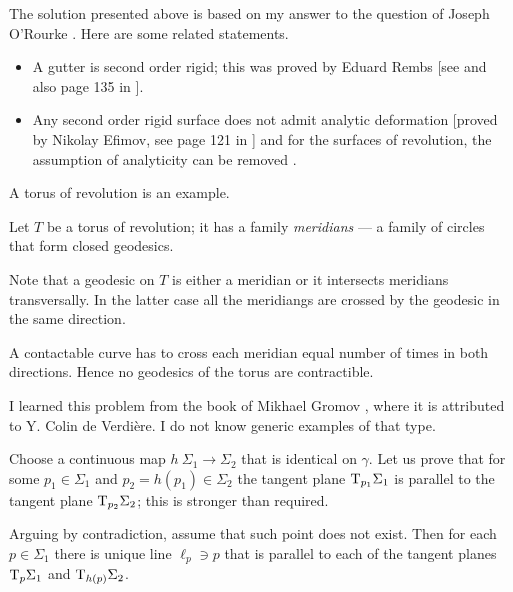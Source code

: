 The solution presented above is based on my answer 
to the question of Joseph O'Rourke \cite[see][]{rourke}.
Here are some related statements.
\begin{itemize}
\item A gutter is second order rigid;
this was proved by Eduard Rembs
[see  and also page 135 in ].
\item Any second order rigid surface does not admit analytic deformation 
[proved by Nikolay Efimov, see page 121 in ]
and for the surfaces of revolution, the assumption of analyticity can be removed 
\cite[proved by Idzhad Sabitov, see][]{sabitov}.
\end{itemize}









A torus of revolution is an example.

\medskip

Let $T$ be a torus of revolution;
it has a family {}\emph{meridians} --- a family of circles that form closed geodesics.

Note that a geodesic on $T$ is either a meridian
or it intersects meridians transversally.
In the latter case all the meridiangs are crossed by the geodesic in the same direction.

A contactable curve has to cross each meridian equal number of times in both directions.
Hence no geodesics of the torus are contractible.\qeds 




I learned this problem 
from the book of Mikhael Gromov \cite[see][]{gromov-MetStr},
where it is attributed to Y. Colin de Verdi\`ere.
I do not know generic examples of that type.

Choose a continuous map $h\:\Sigma_1\to \Sigma_2$
that is identical on $\gamma$.
Let us prove that for some $p_1\in \Sigma_1$ and $p_2=h(p_1)\in \Sigma_2$
the tangent plane $\mathrm{T}_{p_1} \Sigma_1$ is parallel to the tangent plane $\mathrm{T}_{p_2} \Sigma_2$;
this is stronger than required.

\medskip

Arguing by contradiction,
assume that such point does not exist.
Then for each $p\in\Sigma_1$
there is unique line $\ell_p\ni p$ 
that is parallel to each of the tangent planes $\mathrm{T}_{p} \Sigma_1$ and $\mathrm{T}_{h(p)} \Sigma_2$.

